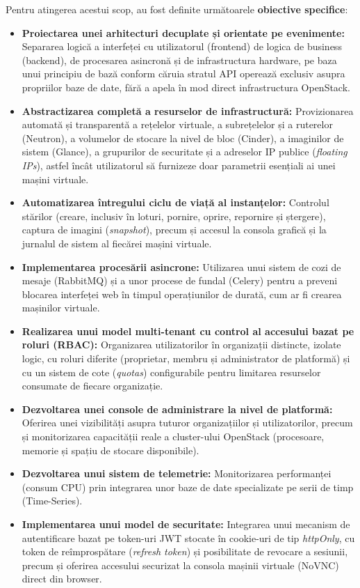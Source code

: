 Pentru atingerea acestui scop, au fost definite următoarele \textbf{obiective specifice}:
\begin{itemize}
    \item \textbf{Proiectarea unei arhitecturi decuplate și orientate pe evenimente:} Separarea logică a interfeței cu utilizatorul (frontend) de logica de business (backend), de procesarea asincronă și de infrastructura hardware, pe baza unui principiu de bază conform căruia stratul API operează exclusiv asupra propriilor baze de date, fără a apela în mod direct infrastructura OpenStack.
    \item \textbf{Abstractizarea completă a resurselor de infrastructură:} Provizionarea automată și transparentă a rețelelor virtuale, a subrețelelor și a ruterelor (Neutron), a volumelor de stocare la nivel de bloc (Cinder), a imaginilor de sistem (Glance), a grupurilor de securitate și a adreselor IP publice (\textit{floating IPs}), astfel încât utilizatorul să furnizeze doar parametrii esențiali ai unei mașini virtuale.
    \item \textbf{Automatizarea întregului ciclu de viață al instanțelor:} Controlul stărilor (creare, inclusiv în loturi, pornire, oprire, repornire și ștergere), captura de imagini (\textit{snapshot}), precum și accesul la consola grafică și la jurnalul de sistem al fiecărei mașini virtuale.
    \item \textbf{Implementarea procesării asincrone:} Utilizarea unui sistem de cozi de mesaje (RabbitMQ) și a unor procese de fundal (Celery) pentru a preveni blocarea interfeței web în timpul operațiunilor de durată, cum ar fi crearea mașinilor virtuale.
    \item \textbf{Realizarea unui model multi-tenant cu control al accesului bazat pe roluri (RBAC):} Organizarea utilizatorilor în organizații distincte, izolate logic, cu roluri diferite (proprietar, membru și administrator de platformă) și cu un sistem de cote (\textit{quotas}) configurabile pentru limitarea resurselor consumate de fiecare organizație.
    \item \textbf{Dezvoltarea unei console de administrare la nivel de platformă:} Oferirea unei vizibilități asupra tuturor organizațiilor și utilizatorilor, precum și monitorizarea capacității reale a cluster-ului OpenStack (procesoare, memorie și spațiu de stocare disponibile).
    \item \textbf{Dezvoltarea unui sistem de telemetrie:} Monitorizarea performanței (consum CPU) prin integrarea unor baze de date specializate pe serii de timp (Time-Series).
    \item \textbf{Implementarea unui model de securitate:} Integrarea unui mecanism de autentificare bazat pe token-uri JWT stocate în cookie-uri de tip \textit{httpOnly}, cu token de reîmprospătare (\textit{refresh token}) și posibilitate de revocare a sesiunii, precum și oferirea accesului securizat la consola mașinii virtuale (NoVNC) direct din browser.
\end{itemize}

